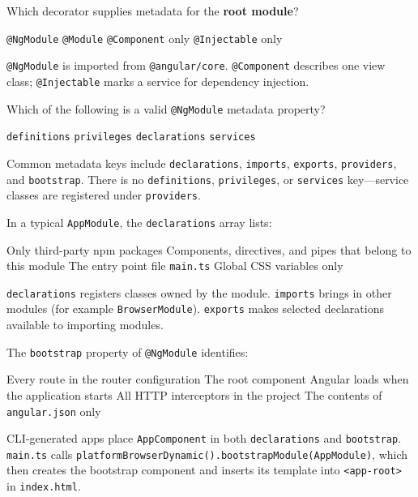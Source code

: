 \question[4]
Which decorator supplies metadata for the \textbf{root module}?
\begin{choices}
  \CorrectChoice \lstinline[style=tsinline]|@NgModule|
  \choice \lstinline[style=tsinline]|@Module|
  \choice \lstinline[style=tsinline]|@Component| only
  \choice \lstinline[style=tsinline]|@Injectable| only
\end{choices}
\begin{solution}
  \lstinline[style=tsinline]|@NgModule| is imported from \lstinline[style=tsinline]|@angular/core|. \lstinline[style=tsinline]|@Component| describes one view class; \lstinline[style=tsinline]|@Injectable| marks a service for dependency injection.
\end{solution}

\question[4]
Which of the following is a valid \lstinline[style=tsinline]|@NgModule| metadata property?
\begin{choices}
  \choice \texttt{definitions}
  \choice \texttt{privileges}
  \CorrectChoice \texttt{declarations}
  \choice \texttt{services}
\end{choices}
\begin{solution}
  Common metadata keys include \texttt{declarations}, \texttt{imports}, \texttt{exports}, \texttt{providers}, and \texttt{bootstrap}. There is no \texttt{definitions}, \texttt{privileges}, or \texttt{services} key---service classes are registered under \texttt{providers}.
\end{solution}

\question[4]
In a typical \texttt{AppModule}, the \texttt{declarations} array lists:
\begin{choices}
  \choice Only third-party npm packages
  \CorrectChoice Components, directives, and pipes that belong to this module
  \choice The entry point file \texttt{main.ts}
  \choice Global CSS variables only
\end{choices}
\begin{solution}
  \texttt{declarations} registers classes owned by the module. \texttt{imports} brings in other modules (for example \texttt{BrowserModule}). \texttt{exports} makes selected declarations available to importing modules.
\end{solution}

\question[4]
The \texttt{bootstrap} property of \texttt{@NgModule} identifies:
\begin{choices}
  \choice Every route in the router configuration
  \CorrectChoice The root component Angular loads when the application starts
  \choice All HTTP interceptors in the project
  \choice The contents of \texttt{angular.json} only
\end{choices}
\begin{solution}
  CLI-generated apps place \texttt{AppComponent} in both \texttt{declarations} and \texttt{bootstrap}. \texttt{main.ts} calls \lstinline[style=tsinline]|platformBrowserDynamic().bootstrapModule(AppModule)|, which then creates the bootstrap component and inserts its template into \lstinline[style=htmlinline]|<app-root>| in \texttt{index.html}.
\end{solution}

